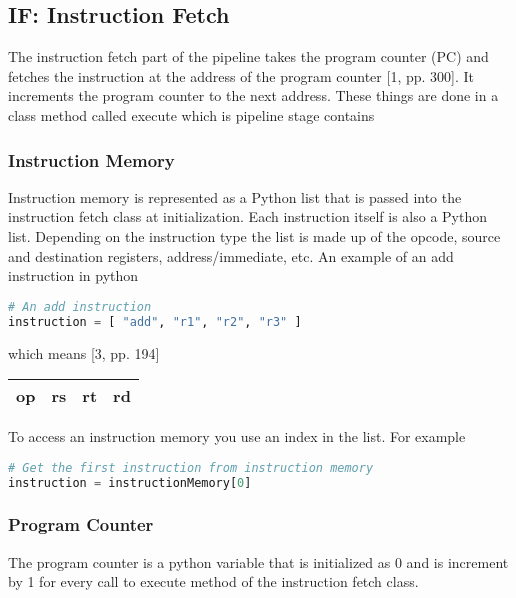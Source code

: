 \documentclass[conference]{IEEEtran}
\begin{document}
\subsection{IF: Instruction Fetch}

The instruction fetch part of the pipeline takes the program counter (PC) and fetches the instruction at the address of the program counter [1, pp. 300].  It increments the program counter to the next address.  These things are done in a class method called execute which is pipeline stage contains

\subsubsection{Instruction Memory}
Instruction memory is represented as a Python list that is passed into the instruction fetch class at initialization.  Each instruction itself is also a Python list.  Depending on the instruction type the list is made up of the opcode, source and destination registers, address/immediate, etc.  An example of an add instruction in python 

\begin{lstlisting}[language=Python]
# An add instruction
instruction = [ "add", "r1", "r2", "r3" ]
\end{lstlisting}

which means [3, pp. 194]

\begin{center}
\begin{tabular}{|c|c|c|c|}
\hline
     op & rs & rt & rd \\
\hline
\end{tabular}
\end{center}

To access an instruction memory you use an index in the list.  For example
\begin{lstlisting}[language=Python]
# Get the first instruction from instruction memory
instruction = instructionMemory[0]
\end{lstlisting}

\subsubsection{Program Counter}
The program counter is a python variable that is initialized as 0 and is increment by 1 for every call to execute method of the instruction fetch class.
\end{document}
